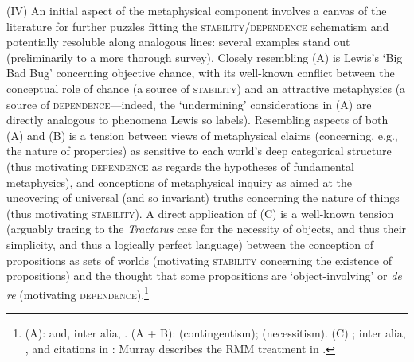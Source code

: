 \documentclass[12pt]{article}
\begin{document}
(IV) An initial aspect of the metaphysical component involves a canvas of the
literature for further puzzles fitting the
\textsc{stability}/\textsc{dependence} schematism and potentially resoluble
along analogous lines: several examples stand out (preliminarily to a more
thorough survey). Closely resembling (A) is Lewis's `Big Bad Bug' concerning
objective chance, with its well-known conflict between the conceptual role of
chance (a source of \textsc{stability}) and an attractive metaphysics (a
source of \textsc{dependence}---indeed, the `undermining' considerations in
(A) are directly analogous to phenomena Lewis so labels).  Resembling aspects
of both (A) and (B) is a tension between views of metaphysical claims
(concerning, e.g., the nature of properties) as sensitive to each world's
deep categorical structure (thus motivating \textsc{dependence} as regards the
hypotheses of fundamental metaphysics), and conceptions of metaphysical
inquiry as aimed at the uncovering of universal (and so invariant) truths
concerning the nature of things (thus motivating \textsc{stability}).  A
direct application of (C) is a well-known tension (arguably tracing to the
\emph{Tractatus} case for the necessity of objects, and thus their simplicity,
and thus a logically perfect language) between the conception of propositions
as sets of worlds (motivating \textsc{stability} concerning the existence of
propositions) and the thought that some propositions are `object-involving' or
\emph{de re} (motivating \textsc{dependence}).\footnote{(A):
\citep{lewis80sg,lewis86intro,lewis94debugged} and, inter alia,
\citep{Hall1994-HALCTG,Thau1994-THAUAA,Arntzenius2003-ARNOWW,Loewer2004-LOEDLH,Briggs2009-BRITAO,Pettigrew2013-PETWCN,Caie2015-CAICIT-3}.
(A + B): \citep{Cameron2007-CAMTCO-2,parsons2013-PARCCA-9, Rosen2006-ROSTLO-2,
Miller2009-MILDCI-3} (contingentism);
\citep{Sider1993-SIDVIA,fineem,Fine2011-FINWIM,Schaffer2007-SCHFNT}
(necessitism).  (C) \citep[2.02--2.0212]{witttlp}; inter alia,
\citep{Prior1967-PRIPPA-2,stalnaker12}, and citations in
\citep{Fritz2016-FRIPC-2}: Murray describes the RMM treatment in
\citep{murray-pdps}.}
\end{document}
